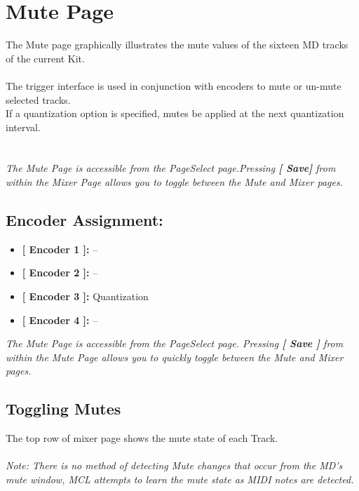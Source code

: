 \chapter{Mute Page}
The Mute page graphically illustrates the mute values of the sixteen MD tracks of the current Kit.\\
\\
The trigger interface is used in conjunction with encoders to mute or un-mute selected tracks.\\
If a quantization option is specified, mutes be applied at the next quantization interval.
\\
\\\\
\textit{The Mute Page is accessible from the PageSelect page.Pressing \textbf{[ Save] } from within the Mixer Page  allows you to toggle between the Mute and Mixer pages.}
\section{Encoder Assignment:}
\begin{itemize}
	\item \textbf{[ Encoder 1 ]: } --
	\item \textbf{[ Encoder 2 ]: } --
	\item \textbf{[ Encoder 3 ]: } Quantization
	\item \textbf{[ Encoder 4 ]: } --
\end{itemize}
\textit{The Mute Page is accessible from the PageSelect page. Pressing  \textbf{[ Save ]} from within the Mute Page allows you to quickly toggle between the Mute and Mixer pages.}

\section{Toggling Mutes}
The top row of mixer page shows the mute state of each Track. \\
\\
\textit{Note: There is no method of detecting Mute changes that occur from the MD's mute window, MCL attempts to learn the mute state as  MIDI notes are detected.}
